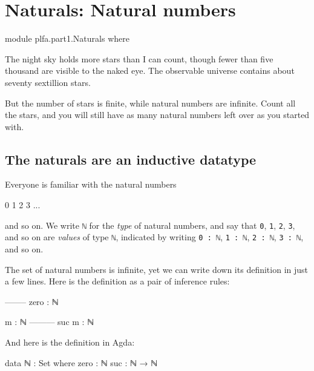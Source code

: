 \hypertarget{Naturals}{%
\chapter{Naturals: Natural numbers}\label{Naturals}}

\begin{fence}
\begin{code}
module plfa.part1.Naturals where
\end{code}
\end{fence}

The night sky holds more stars than I can count, though fewer than five
thousand are visible to the naked eye. The observable universe contains
about seventy sextillion stars.

But the number of stars is finite, while natural numbers are infinite.
Count all the stars, and you will still have as many natural numbers
left over as you started with.

\hypertarget{the-naturals-are-an-inductive-datatype}{%
\section{The naturals are an inductive
datatype}\label{the-naturals-are-an-inductive-datatype}}

Everyone is familiar with the natural numbers

\begin{myDisplay}
0
1
2
3
...
\end{myDisplay}

and so on. We write \texttt{ℕ} for the \emph{type} of natural numbers,
and say that \texttt{0}, \texttt{1}, \texttt{2}, \texttt{3}, and so on
are \emph{values} of type \texttt{ℕ}, indicated by writing
\texttt{0\ :\ ℕ}, \texttt{1\ :\ ℕ}, \texttt{2\ :\ ℕ}, \texttt{3\ :\ ℕ},
and so on.

The set of natural numbers is infinite, yet we can write down its
definition in just a few lines. Here is the definition as a pair of
inference rules:

\begin{myDisplay}
--------
zero : ℕ

m : ℕ
---------
suc m : ℕ
\end{myDisplay}

And here is the definition in Agda:

\begin{fence}
\begin{code}
data ℕ : Set where
  zero : ℕ
  suc  : ℕ → ℕ
\end{code}
\end{fence}

